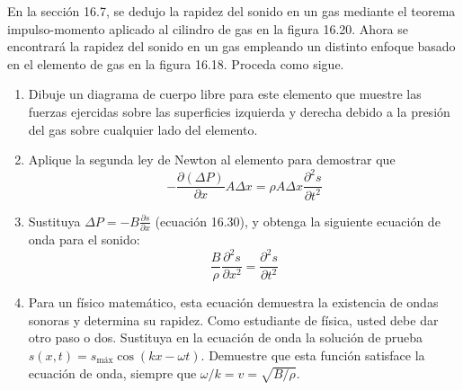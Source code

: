 \item En la sección 16.7, se dedujo la rapidez del sonido en un gas mediante el teorema impulso-momento aplicado al cilindro de gas en la figura 16.20. Ahora se encontrará la rapidez del sonido en un gas empleando un distinto enfoque basado en el elemento de gas en la figura 16.18. Proceda como sigue.
\begin{enumerate}
    \item Dibuje un diagrama de cuerpo libre para este elemento que muestre las fuerzas ejercidas sobre las superficies izquierda y derecha debido a la presión del gas sobre cualquier lado del elemento.
    \item Aplique la segunda ley de Newton al elemento para demostrar que
$$ -\frac{\partial(\Delta P)}{\partial x} A \Delta x = \rho A \Delta x \frac{\partial^2 s}{\partial t^2} $$
    \item Sustituya $\Delta P = -B \frac{\partial s}{\partial x}$ (ecuación 16.30), y obtenga la siguiente ecuación de onda para el sonido:
$$ \frac{B}{\rho} \frac{\partial^2 s}{\partial x^2} = \frac{\partial^2 s}{\partial t^2} $$
    \item Para un físico matemático, esta ecuación demuestra la existencia de ondas sonoras y determina su rapidez. Como estudiante de física, usted debe dar otro paso o dos. Sustituya en la ecuación de onda la solución de prueba $s(x,t) = s_{\text{máx}} \cos(kx-\omega t)$. Demuestre que esta función satisface la ecuación de onda, siempre que $\omega / k = v = \sqrt{B/\rho}$.
\end{enumerate}